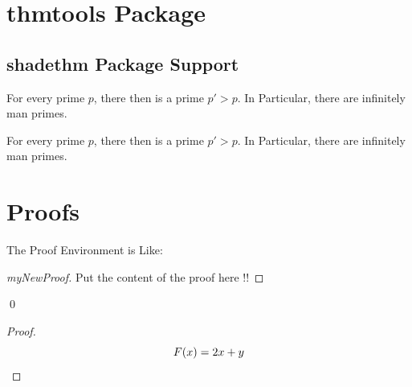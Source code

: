 \documentclass{article}
\theoremstyle{definition}
\theoremstyle{remark}
\theoremstyle{myStyle}
\renewcommand\qedsymbol{\fbox{Ended}}
\begin{document}
	\pagebreak
	
	\section{thmtools Package}
	\subsection{shadethm Package Support}
	\begin{shTheorem}
		For every prime $p$, there then is a prime 
			$p'>p$. In Particular, there are infinitely 			man primes.		
	\end{shTheorem}
	\begin{ruledThm}
	For every prime $p$, there then is a prime 
			$p'>p$. In Particular, there are infinitely 			man primes.
	\end{ruledThm}
	
	\vspace{2cm}
	
	
	\pagebreak
	
	\section{Proofs}
	The Proof Environment is Like:
	\begin{proof}[myNewProof]
		Put the content of the proof here !!
		\renewcommand{\qedsymbol}{}
	\end{proof}
	
	\lipsum[1] \qed
	
	\begin{proof}
		\renewcommand\qedsymbol{$\clubsuit$}
		\begin{equation*}
			F(x) = 2x + y
			\qedhere
		\end{equation*}
	\end{proof}
	
\end{document}
